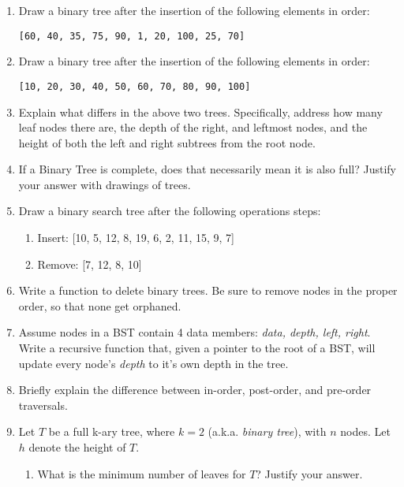 \documentclass[11pt]{article}
\begin{document}
    \begin{enumerate}
        \item Draw a binary tree after the insertion of the following elements in order: 
        
        \verb|[60, 40, 35, 75, 90, 1, 20, 100, 25, 70]|
        
        \item Draw a binary tree after the insertion of the following elements in order: 
        
        \verb|[10, 20, 30, 40, 50, 60, 70, 80, 90, 100]|
        
        \item Explain what differs in the above two trees. Specifically, address how many leaf nodes there are, the depth of the right, and leftmost nodes, and the height of both the left and right subtrees from the root node. 
        
        \item If a Binary Tree is complete, does that necessarily mean it is also full? Justify your answer with drawings of trees.
        
        \item Draw a binary search tree after the following operations steps:
    \begin{enumerate}
        
        \item Insert: [10, 5, 12, 8, 19, 6, 2, 11, 15, 9, 7]
        
        \item Remove: [7, 12, 8, 10]
    \end{enumerate}
    \item Write a function to delete binary trees. Be sure to remove nodes in the proper order, so that none get orphaned.

    \item Assume nodes in a BST contain 4 data members: {\it data, depth, left, right}.  Write a recursive function that, given a pointer to the root of a BST, will update every node's {\it depth} to it's own depth in the tree.

    \item Briefly explain the difference between in-order, post-order, and pre-order traversals.

    \item Let $T$ be a full k-ary tree, where $k=2$ (a.k.a. {\it binary tree}), with $n$ nodes.  Let $h$ denote the height of $T$.
    \begin{enumerate}
        \item What is the minimum number of leaves for $T$?  Justify your answer.


\end{enumerate}
\end{enumerate}
\end{document}
